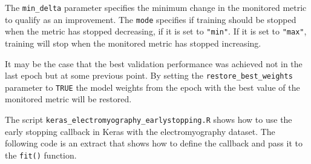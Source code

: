 \documentclass[
  11pt,
]{krantz}
\newenvironment{Shaded}{\begin{snugshade}}{\end{snugshade}}
\newcommand{\AttributeTok}[1]{\textcolor[rgb]{0.61,0.61,0.61}{#1}}
\newcommand{\CommentTok}[1]{\textcolor[rgb]{0.37,0.37,0.37}{\textit{#1}}}
\newcommand{\ConstantTok}[1]{\textcolor[rgb]{0,0,0}{#1}}
\newcommand{\DecValTok}[1]{\textcolor[rgb]{0.06,0.06,0.06}{#1}}
\newcommand{\FloatTok}[1]{\textcolor[rgb]{0.06,0.06,0.06}{#1}}
\newcommand{\FunctionTok}[1]{\textcolor[rgb]{0,0,0}{#1}}
\newcommand{\NormalTok}[1]{#1}
\newcommand{\OtherTok}[1]{\textcolor[rgb]{0.37,0.37,0.37}{#1}}
\newcommand{\SpecialCharTok}[1]{\textcolor[rgb]{0,0,0}{#1}}
\newcommand{\StringTok}[1]{\textcolor[rgb]{0.5,0.5,0.5}{#1}}
\begin{document}
The \texttt{min\_delta} parameter specifies the minimum change in the monitored metric to qualify as an improvement. The \texttt{mode} specifies if training should be stopped when the metric has stopped decreasing, if it is set to \texttt{"min"}. If it is set to \texttt{"max"}, training will stop when the monitored metric has stopped increasing.

It may be the case that the best validation performance was achieved not in the last epoch but at some previous point. By setting the \texttt{restore\_best\_weights} parameter to \texttt{TRUE} the model weights from the epoch with the best value of the monitored metric will be restored.

The script \texttt{keras\_electromyography\_earlystopping.R} shows how to use the early stopping callback in Keras with the electromyography dataset. The following code is an extract that shows how to define the callback and pass it to the \texttt{fit()} function.

\begin{Shaded}
\end{Shaded}
\end{document}
